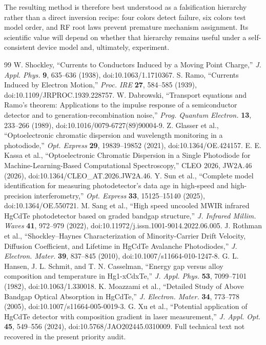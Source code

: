 \documentclass[11pt]{article}
\begin{document}
The resulting method is therefore best understood as a falsification hierarchy rather than a direct inversion recipe: four colors detect failure, six colors test model order, and RF root laws prevent premature mechanism assignment. Its scientific value will depend on whether that hierarchy remains useful under a self-consistent device model and, ultimately, experiment.

\begin{thebibliography}{99}
 W. Shockley, ``Currents to Conductors Induced by a Moving Point Charge,'' \emph{J. Appl. Phys.} \textbf{9}, 635--636 (1938), doi:10.1063/1.1710367.
 S. Ramo, ``Currents Induced by Electron Motion,'' \emph{Proc. IRE} \textbf{27}, 584--585 (1939), doi:10.1109/JRPROC.1939.228757.
 W. Dabrowski, ``Transport equations and Ramo's theorem: Applications to the impulse response of a semiconductor detector and to generation-recombination noise,'' \emph{Prog. Quantum Electron.} \textbf{13}, 233--266 (1989), doi:10.1016/0079-6727(89)90004-9.
 Z. Glasser et al., ``Optoelectronic chromatic dispersion and wavelength monitoring in a photodiode,'' \emph{Opt. Express} \textbf{29}, 19839--19852 (2021), doi:10.1364/OE.424157.
 E. E. Kassa et al., ``Optoelectronic Chromatic Dispersion in a Single Photodiode for Machine-Learning-Based Computational Spectroscopy,'' CLEO 2026, JW2A.46 (2026), doi:10.1364/CLEO\_AT.2026.JW2A.46.
 Y. Sun et al., ``Complete model identification for measuring photodetector's data age in high-speed and high-precision interferometry,'' \emph{Opt. Express} \textbf{33}, 15125--15140 (2025), doi:10.1364/OE.550721.
 M. Sang et al., ``High speed uncooled MWIR infrared HgCdTe photodetector based on graded bandgap structure,'' \emph{J. Infrared Millim. Waves} \textbf{41}, 972--979 (2022), doi:10.11972/j.issn.1001-9014.2022.06.005.
 J. Rothman et al., ``Shockley--Haynes Characterization of Minority-Carrier Drift Velocity, Diffusion Coefficient, and Lifetime in HgCdTe Avalanche Photodiodes,'' \emph{J. Electron. Mater.} \textbf{39}, 837--845 (2010), doi:10.1007/s11664-010-1247-8.
 G. L. Hansen, J. L. Schmit, and T. N. Casselman, ``Energy gap versus alloy composition and temperature in Hg1-xCdxTe,'' \emph{J. Appl. Phys.} \textbf{53}, 7099--7101 (1982), doi:10.1063/1.330018.
 K. Moazzami et al., ``Detailed Study of Above Bandgap Optical Absorption in HgCdTe,'' \emph{J. Electron. Mater.} \textbf{34}, 773--778 (2005), doi:10.1007/s11664-005-0019-3.
 G. Xu et al., ``Potential application of HgCdTe detector with composition gradient in laser measurement,'' \emph{J. Appl. Opt.} \textbf{45}, 549--556 (2024), doi:10.5768/JAO202445.0310009. Full technical text not recovered in the present priority audit.
\end{thebibliography}
\end{document}
